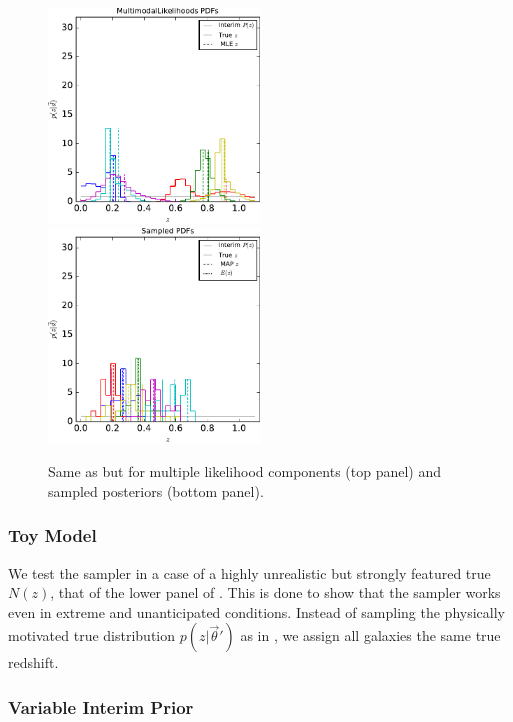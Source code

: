 \begin{figure}
	\includegraphics[width=0.5\textwidth]{figures/chippr/mult_samplepzs.pdf}\\
	\includegraphics[width=0.5\textwidth]{figures/chippr/samp_samplepzs.pdf}
	\caption{Same as  but for multiple likelihood components (top panel) and sampled posteriors (bottom panel).}
\end{figure}

\subsubsection{Toy Model}

We test the sampler in a case of a highly unrealistic but strongly featured true $N(z)$, that of the lower panel of .  
This is done to show that the sampler works even in extreme and unanticipated conditions.  
Instead of sampling the physically motivated true distribution $p(z|\vec{\theta}')$ as in , we assign all galaxies the same true redshift.  

\subsubsection{Variable Interim Prior}

